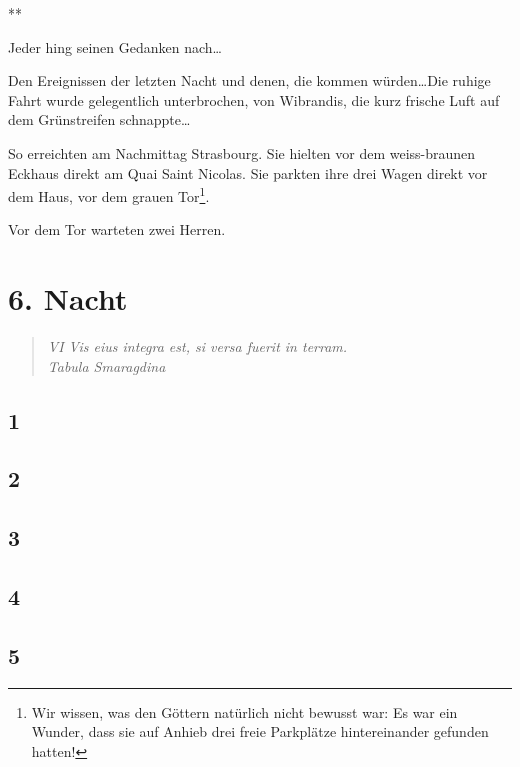 \documentclass[11pt,titlepage,a5paper]{book}
\newcommand{\sterne}{\par{\centering ***\par}}
\begin{document}
\sterne

Jeder hing seinen Gedanken nach\dots

Den Ereignissen der letzten Nacht und denen, die kommen würden\dots Die ruhige Fahrt wurde gelegentlich unterbrochen, von Wibrandis, die kurz frische Luft auf dem Grünstreifen schnappte\dots

So erreichten am Nachmittag Strasbourg. Sie hielten vor dem weiss-braunen Eckhaus direkt am Quai Saint Nicolas. Sie parkten ihre drei Wagen direkt vor dem Haus, vor dem grauen Tor\footnote{Wir wissen, was den Göttern natürlich nicht bewusst war: Es war ein Wunder, dass sie auf Anhieb drei freie Parkplätze hintereinander gefunden hatten!}.

Vor dem Tor warteten zwei Herren.

\chapter*{6. Nacht}

\begin{quotation}

\emph{VI Vis eius integra est, si versa fuerit in terram. \\Tabula Smaragdina}

\end{quotation}

\section*{1}

\section*{2}

\section*{3}

\section*{4}

\section*{5}
\end{document}
